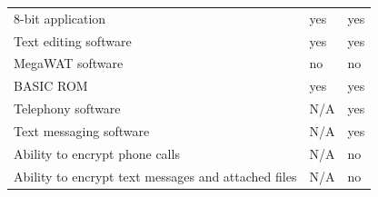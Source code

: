 \begin{table}[h!]
\begin{center}
\begin{tabular}{l|l|l}
      8-bit application										& yes 		& yes \\
      Text editing software									& yes 		& yes \\
      MegaWAT software										& no 		& no \\
      BASIC ROM												& yes 		& yes \\
      Telephony software  									& N/A		& yes \\
  	  Text messaging software								& N/A		& yes \\
  	  Ability to encrypt phone calls						& N/A		& no \\
  	  Ability to encrypt text messages and attached files	& N/A		& no \\
    \end{tabular}
  \end{center}
\end{table}
